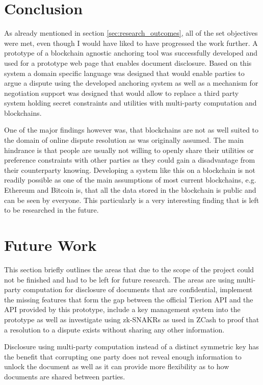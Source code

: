 \documentclass[12pt,msc,a4paper,oneside]{ucl_thesis}
\begin{document}
\section{Conclusion} \label{sec:conclusion}
As already mentioned in section \ref{sec:research_outcomes}, all of the set objectives were met, even though I would have liked to have progressed the work further. A prototype of a blockchain agnostic anchoring tool was successfully developed and used for a prototype web page that enables document disclosure. Based on this system a domain specific language was designed that would enable parties to argue a dispute using the developed anchoring system as well as a mechanism for negotiation support was designed that would allow to replace a third party system holding secret constraints and utilities with multi-party computation and blockchains. 

One of the major findings however was, that blockchains are not as well suited to the domain of online dispute resolution as was originally assumed. The main hindrance is that people are usually not willing to openly share their utilities or preference constraints with other parties as they could gain a disadvantage from their counterparty knowing. Developing a system like this on a blockchain is not readily possible as one of the main assumptions of most current blockchains, e.g. Ethereum and Bitcoin is, that all the data stored in the blockchain is public and can be seen by everyone. This particularly is a very interesting finding that is left to be researched in the future.

\section{Future Work} \label{sec:future_work}
This section briefly outlines the areas that due to the scope of the project could not be finished and had to be left for future research. The areas are using multi-party computation for disclosure of documents that are confidential, implement the missing features that form the gap between the official Tierion API and the API provided by this prototype, include a key management system into the prototype as well as investigate using zk-SNAKRs as used in ZCash to proof that a resolution to a dispute exists without sharing any other information.

Disclosure using multi-party computation instead of a distinct symmetric key has the benefit that corrupting one party does not reveal enough information to unlock the document as well as it can provide more flexibility as to how documents are shared between parties.
\end{document}
